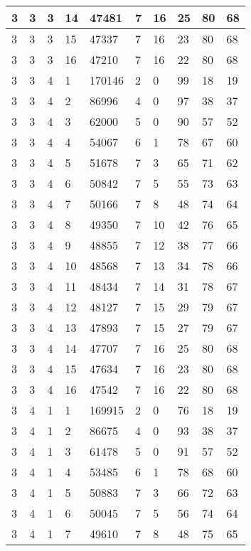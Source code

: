 \begin{table}[!ht]
\begin{tabular}{|l|l|l|l|l|l|l|l|l|l|}
        3 & 3 & 3 & 14 & 47481 & 7 & 16 & 25 & 80 & 68 \\ \hline
        3 & 3 & 3 & 15 & 47337 & 7 & 16 & 23 & 80 & 68 \\ \hline
        3 & 3 & 3 & 16 & 47210 & 7 & 16 & 22 & 80 & 68 \\ \hline
        3 & 3 & 4 & 1 & 170146 & 2 & 0 & 99 & 18 & 19 \\ \hline
        3 & 3 & 4 & 2 & 86996 & 4 & 0 & 97 & 38 & 37 \\ \hline
        3 & 3 & 4 & 3 & 62000 & 5 & 0 & 90 & 57 & 52 \\ \hline
        3 & 3 & 4 & 4 & 54067 & 6 & 1 & 78 & 67 & 60 \\ \hline
        3 & 3 & 4 & 5 & 51678 & 7 & 3 & 65 & 71 & 62 \\ \hline
        3 & 3 & 4 & 6 & 50842 & 7 & 5 & 55 & 73 & 63 \\ \hline
        3 & 3 & 4 & 7 & 50166 & 7 & 8 & 48 & 74 & 64 \\ \hline
        3 & 3 & 4 & 8 & 49350 & 7 & 10 & 42 & 76 & 65 \\ \hline
        3 & 3 & 4 & 9 & 48855 & 7 & 12 & 38 & 77 & 66 \\ \hline
        3 & 3 & 4 & 10 & 48568 & 7 & 13 & 34 & 78 & 66 \\ \hline
        3 & 3 & 4 & 11 & 48434 & 7 & 14 & 31 & 78 & 67 \\ \hline
        3 & 3 & 4 & 12 & 48127 & 7 & 15 & 29 & 79 & 67 \\ \hline
        3 & 3 & 4 & 13 & 47893 & 7 & 15 & 27 & 79 & 67 \\ \hline
        3 & 3 & 4 & 14 & 47707 & 7 & 16 & 25 & 80 & 68 \\ \hline
        3 & 3 & 4 & 15 & 47634 & 7 & 16 & 23 & 80 & 68 \\ \hline
        3 & 3 & 4 & 16 & 47542 & 7 & 16 & 22 & 80 & 68 \\ \hline
        3 & 4 & 1 & 1 & 169915 & 2 & 0 & 76 & 18 & 19 \\ \hline
        3 & 4 & 1 & 2 & 86675 & 4 & 0 & 93 & 38 & 37 \\ \hline
        3 & 4 & 1 & 3 & 61478 & 5 & 0 & 91 & 57 & 52 \\ \hline
        3 & 4 & 1 & 4 & 53485 & 6 & 1 & 78 & 68 & 60 \\ \hline
        3 & 4 & 1 & 5 & 50883 & 7 & 3 & 66 & 72 & 63 \\ \hline
        3 & 4 & 1 & 6 & 50045 & 7 & 5 & 56 & 74 & 64 \\ \hline
        3 & 4 & 1 & 7 & 49610 & 7 & 8 & 48 & 75 & 65 \\ \hline

\end{tabular}
\end{table}
